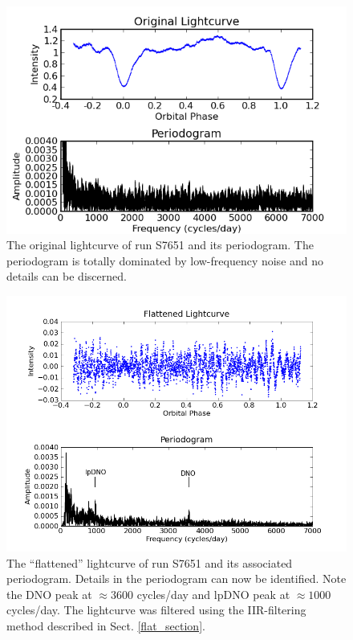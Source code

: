 \begin{figure}
\begin{center}
\includegraphics[width=0.80\columnwidth,bb=0 0 600 400]{images/unflattened.png}
\caption[Original lightcurve and periodogram]{The original lightcurve of run S7651 and its periodogram. The periodogram is totally dominated by low-frequency noise and no details can be discerned.}
\label{unflat}
\end{center}
\end{figure}


\begin{figure}
\begin{center}
\includegraphics[width=0.80\columnwidth,bb=0 0 600 400]{images/flattened.png}

\caption[Flattened lightcurve and periodogram]{The ``flattened'' lightcurve of run S7651 and its associated periodogram. Details in the periodogram can now be identified. Note the DNO peak at $\approx 3600$ cycles/day and lpDNO peak at $\approx1000$ cycles/day. The lightcurve was filtered using the IIR-filtering method described in Sect. \ref{flat_section}. }
\label{flat}
\end{center}
\end{figure}

